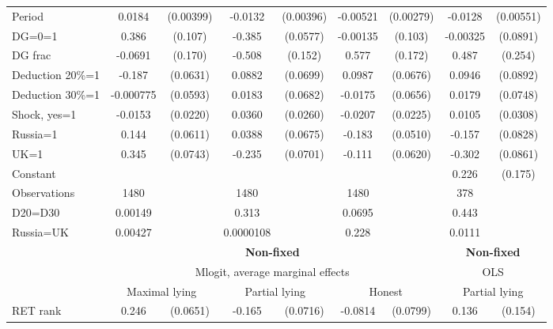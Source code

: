 \begin{tabular}{l|cccccc|cc}
Period          &   0.0184\sym{***}&(0.00399)&  -0.0132\sym{***}&(0.00396)& -0.00521\sym{*}  &(0.00279)&  -0.0128\sym{**} &(0.00551)\\
DG=0=1          &    0.386\sym{***}&  (0.107)&   -0.385\sym{***}& (0.0577)& -0.00135         &  (0.103)& -0.00325         & (0.0891)\\
DG frac         &  -0.0691         &  (0.170)&   -0.508\sym{***}&  (0.152)&    0.577\sym{***}&  (0.172)&    0.487\sym{*}  &  (0.254)\\
Deduction 20\%=1&   -0.187\sym{***}& (0.0631)&   0.0882         & (0.0699)&   0.0987         & (0.0676)&   0.0946         & (0.0892)\\
Deduction 30\%=1&-0.000775         & (0.0593)&   0.0183         & (0.0682)&  -0.0175         & (0.0656)&   0.0179         & (0.0748)\\
Shock, yes=1    &  -0.0153         & (0.0220)&   0.0360         & (0.0260)&  -0.0207         & (0.0225)&   0.0105         & (0.0308)\\
Russia=1        &    0.144\sym{**} & (0.0611)&   0.0388         & (0.0675)&   -0.183\sym{***}& (0.0510)&   -0.157\sym{*}  & (0.0828)\\
UK=1            &    0.345\sym{***}& (0.0743)&   -0.235\sym{***}& (0.0701)&   -0.111\sym{*}  & (0.0620)&   -0.302\sym{***}& (0.0861)\\
Constant        &                  &         &                  &         &                  &         &    0.226         &  (0.175)\\
\hline
Observations    &     1480         &         &     1480         &         &     1480         &         &      378         &         \\
D20=D30         &  0.00149         &         &    0.313         &         &   0.0695         &         &    0.443         &         \\
Russia=UK       &  0.00427         &         &0.0000108         &         &    0.228         &         &   0.0111         &         \\
\hline\hline
&\multicolumn{6}{c|}{\bf Non-fixed}&\multicolumn{2}{c}{\bf Non-fixed}\\ &\multicolumn{6}{c|}{Mlogit, average marginal effects }&\multicolumn{2}{c}{OLS}\\
                &\multicolumn{2}{c}{Maximal lying}&\multicolumn{2}{c}{Partial lying}&\multicolumn{2}{c}{Honest}  &\multicolumn{2}{c}{Partial lying}\\
\hline
RET rank        &    0.246\sym{***}& (0.0651)&   -0.165\sym{**} & (0.0716)&  -0.0814         & (0.0799)&    0.136         &  (0.154)\\

\end{tabular}
